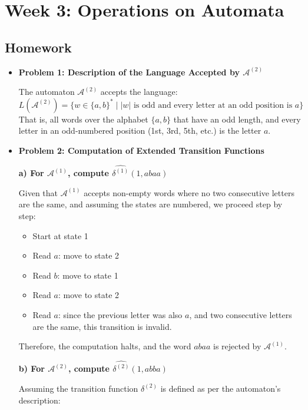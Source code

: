 \documentclass[11pt]{article}
\begin{document}
\section{Week 3: Operations on Automata}

\subsection{Homework}

\begin{itemize}[leftmargin=*]

\item \textbf{Problem 1: Description of the Language Accepted by \( \mathcal{A}^{(2)} \)}

The automaton \( \mathcal{A}^{(2)} \) accepts the language:
\[
L(\mathcal{A}^{(2)}) = \{ w \in \{a,b\}^* \mid |w| \text{ is odd and every letter at an odd position is } a \}
\]
That is, all words over the alphabet \( \{a,b\} \) that have an odd length, and every letter in an odd-numbered position (1st, 3rd, 5th, etc.) is the letter \( a \).

\item \textbf{Problem 2: Computation of Extended Transition Functions}

\textbf{a) For \( \mathcal{A}^{(1)} \), compute \( \widehat{\delta^{(1)}}(1, abaa) \)}

Given that \( \mathcal{A}^{(1)} \) accepts non-empty words where no two consecutive letters are the same, and assuming the states are numbered, we proceed step by step:

\begin{itemize}
    \item Start at state 1
    \item Read \( a \): move to state 2
    \item Read \( b \): move to state 1
    \item Read \( a \): move to state 2
    \item Read \( a \): since the previous letter was also \( a \), and two consecutive letters are the same, this transition is invalid.
\end{itemize}

Therefore, the computation halts, and the word \( abaa \) is rejected by \( \mathcal{A}^{(1)} \).

\textbf{b) For \( \mathcal{A}^{(2)} \), compute \( \widehat{\delta^{(2)}}(1, abba) \)}

Assuming the transition function \( \delta^{(2)} \) is defined as per the automaton’s description:


\end{itemize}
\end{document}
